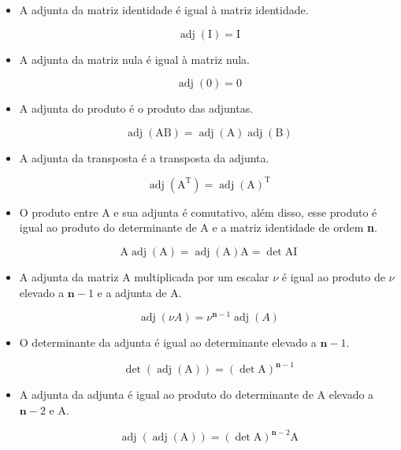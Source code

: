 \documentclass[a4paper,12pt]{article}
\begin{document}
\begin{itemize}

    \item A adjunta da matriz identidade é igual à matriz identidade.
    
    $$ \operatorname{adj} ( \text{I} ) = \text{I} $$
    
    \item A adjunta da matriz nula é igual à matriz nula.
    
    $$ \operatorname{adj} ( \text{0} ) = \text{0} $$
    
    \item A adjunta do produto é o produto das adjuntas.
    
    $$ \operatorname{adj} ( \text{A} \text{B} ) = \operatorname{adj} ( \text{A} ) \operatorname{adj} ( \text{B} ) $$
    
    \item A adjunta da transposta é a transposta da adjunta.
    
    $$ \operatorname{adj} ( \text{A}^{\text{T}} ) = \operatorname{adj} ( \text{A} ) ^{\text{T}} $$
    
    \item O produto entre $ \text{A} $ e sua adjunta é comutativo, além disso, esse produto é igual ao produto do determinante de $ \text{A} $ e a matriz identidade de ordem \textbf{n}.
    
    $$ \text{A} \operatorname{adj} ( \text{A} ) = \operatorname{adj} ( \text{A} ) \text{A} = \det \text{A} \text{I} $$
    
    \item A adjunta da matriz $ \text{A} $ multiplicada por um escalar $ \nu $ é igual ao produto de $ \nu $ elevado a $ \textbf{n} - 1 $ e a adjunta de $ \text{A} $.
    
    
    $$ \operatorname{adj} ( \nu A ) = \nu^{\textbf{n} - 1} \operatorname{adj} ( A ) $$
    
    \item O determinante da adjunta é igual ao determinante elevado a $ \textbf{n} - 1 $.
    
    $$ \det ( \operatorname{adj} ( \text{A} ) ) = (\det \text{A})^{\textbf{n} - 1} $$
    
    \item A adjunta da adjunta é igual ao produto do determinante de $ \text{A} $ elevado a $ \textbf{n} - 2 $ e $ \text{A} $.
    
    $$ \operatorname{adj} ( \operatorname{adj} ( \text{A} ) ) = ( \det \text{A} )^{\textbf{n} - 2} \text{A} $$
    
\end{itemize}
\end{document}
